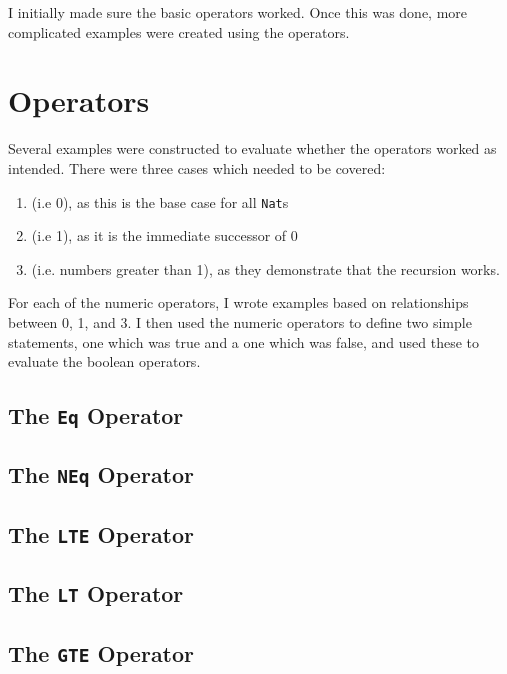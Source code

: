 I initially made sure the basic operators worked. Once this was done, more
complicated examples were created using the operators.
\section{Operators}\label{evaln:ops}
	Several examples were constructed to evaluate whether the operators worked
	as intended. There were three cases which needed to be covered:
	\begin{enumerate}
		\item {} (i.e 0), as this is the base case for all
			  \texttt{Nat}s
		\item {} (i.e 1), as it is the immediate successor of 0
		\item {} (i.e. numbers greater than 1), as they
			  demonstrate that the recursion works.
	\end{enumerate}
	For each of the numeric operators, I wrote examples based on relationships between 0, 1, and 3. I then used the numeric operators to define two simple statements, one which was true and a one which was false, and used these to evaluate the boolean operators.
	
	\newpage
	
    \subsection{The \texttt{Eq} Operator}
    
    \subsection{The \texttt{NEq} Operator}\label{evaln:ops:neq}
    
    \subsection{The \texttt{LTE} Operator}
    
    \subsection{The \texttt{LT} Operator}
    
    \subsection{The \texttt{GTE} Operator}
    
